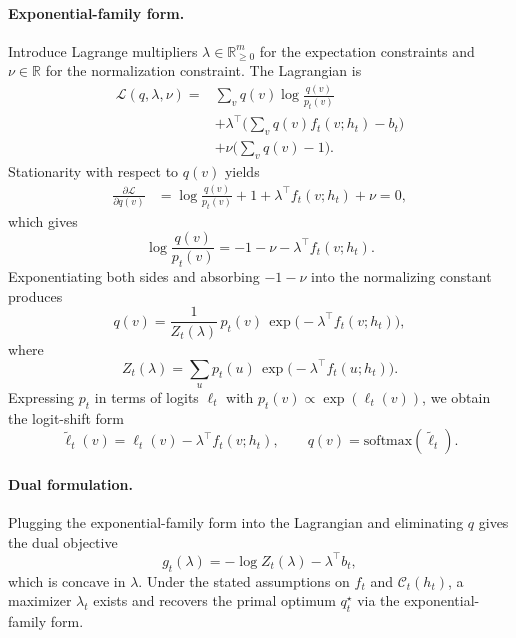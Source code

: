 \documentclass{article}
\theoremstyle{plain}
\theoremstyle{definition}
\theoremstyle{remark}
\begin{document}
\paragraph{Exponential-family form.}
Introduce Lagrange multipliers $\lambda \in \mathbb{R}^m_{\ge 0}$ for the expectation constraints and $\nu \in \mathbb{R}$ for the normalization constraint.
The Lagrangian is
\begin{equation}  %
\begin{split}     %
  \mathcal{L}(q,\lambda,\nu)
  = & \sum_v q(v)\log\frac{q(v)}{p_t(v)} \\
    & + \lambda^\top\Big(\sum_v q(v) f_t(v;h_t) - b_t\Big) \\
    & + \nu\Big(\sum_v q(v)-1\Big).
\end{split}
\end{equation}
Stationarity with respect to $q(v)$ yields
\begin{align}
  \frac{\partial \mathcal{L}}{\partial q(v)}
  &=
  \log\frac{q(v)}{p_t(v)} + 1
  + \lambda^\top f_t(v;h_t)
  + \nu
  = 0,
\end{align}
which gives
\begin{equation}
  \log\frac{q(v)}{p_t(v)}
  =
  -1 - \nu - \lambda^\top f_t(v;h_t).
\end{equation}
Exponentiating both sides and absorbing $-1-\nu$ into the normalizing constant produces
\begin{equation}
  q(v)
  =
  \frac{1}{Z_t(\lambda)}\,
  p_t(v)\, \exp\big(-\lambda^\top f_t(v;h_t)\big),
\end{equation}
where
\begin{equation}
  Z_t(\lambda)
  =
  \sum_{u} p_t(u)\, \exp\big(-\lambda^\top f_t(u;h_t)\big).
\end{equation}
Expressing $p_t$ in terms of logits $\ell_t$ with $p_t(v) \propto \exp(\ell_t(v))$,
we obtain the logit-shift form
\begin{equation}
  \tilde{\ell}_t(v)
  =
  \ell_t(v) - \lambda^\top f_t(v;h_t),
  \qquad
  q(v) = \mathrm{softmax}(\tilde{\ell}_t).
\end{equation}

\paragraph{Dual formulation.}
Plugging the exponential-family form into the Lagrangian and eliminating $q$ gives the dual objective
\begin{equation}
  g_t(\lambda)
  =
  -\log Z_t(\lambda) - \lambda^\top b_t,
\end{equation}
which is concave in $\lambda$.
Under the stated assumptions on $f_t$ and $\mathcal{C}_t(h_t)$, a maximizer $\lambda_t$ exists and recovers the primal optimum $q_t^\star$ via the exponential-family form.
\end{document}
